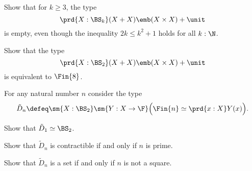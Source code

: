 \begin{exercises}
  \exitem
  \begin{subexenum}
    \item Show that for $k\geq 3$, the type
    \begin{equation*}
      \prd{X:\BS_k}(X+X)\emb (X\times X)+\unit
    \end{equation*}
    is empty, even though the inequality $2k\leq k^2+1$ holds for all $k:\N$.
  \item Show that the type
    \begin{equation*}
      \prd{X:\BS_2}(X+X)\emb (X\times X)+\unit
    \end{equation*}
    is equivalent to $\Fin{8}$.
  \end{subexenum}
  \exitem \label{ex:prime}For any natural number $n$ consider the type
  \begin{equation*}
    \tilde{D}_n\defeq\sm{X:\BS_2}\sm{Y:X\to\F}\Big(\Fin{n}\simeq\prd{x:X}Y(x)\Big).
  \end{equation*}
  \begin{subexenum}
  \item Show that $\tilde{D}_{1}\simeq \BS_2$.
  \item Show that $\tilde{D}_{n}$ is contractible if and only if $n$ is prime.
  \item Show that $\tilde{D}_n$ is a set if and only if $n$ is not a square.
  \end{subexenum}
\end{exercises}

